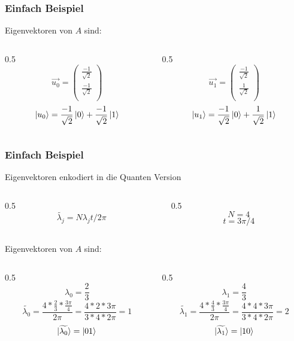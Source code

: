 \begin{frame}
    \frametitle{Einfach Beispiel}


    Eigenvektoren von $A$ sind:    
    \begin{columns}[c]
        \begin{column}{0.5\hsize}\centering
            $$ \vec{u_0} = \begin{pmatrix} \frac{-1}{\sqrt{2}}\\ \frac{-1}{\sqrt{2}}\\ \end{pmatrix}$$
            $$ \ket{u_0} = \frac{-1}{\sqrt{2}}\ket{0} + \frac{-1}{\sqrt{2}}\ket{1}$$
        \end{column}

        \begin{column}{0.5\hsize}
            $$\vec{u_1} = \begin{pmatrix} \frac{-1}{\sqrt{2}}\\ \frac{1}{\sqrt{2}}\\ \end{pmatrix}$$
            $$\ket{u_1}= \frac{-1}{\sqrt{2}}\ket{0} + \frac{1}{\sqrt{2}}\ket{1}$$
        \end{column}
    \end{columns}

\end{frame}

\begin{frame}
    \frametitle{Einfach Beispiel}

    Eigenvektoren enkodiert in die Quanten Version
    \begin{columns}[c]
        \begin{column}{0.5\hsize}\centering
        $$\widetilde{\lambda_j} = N\lambda_jt/2\pi$$
        \end{column}

        \begin{column}{0.5\hsize}
            $$N = 4$$
            $$t = 3\pi/4$$
        \end{column}
    \end{columns}

    \hfil

    \hfil

    Eigenvektoren von $A$ sind:    
    \begin{columns}[c]
        \begin{column}{0.5\hsize}\centering
            $$\lambda_0 = \frac{2}{3}$$
            $$\widetilde{\lambda_0} =\frac{4*\frac{2}{3}*\frac{3\pi}{4}}{2 \pi} =\frac{4*2*3\pi}{3*4* 2 \pi} = 1$$
            $$\ket{\widetilde{\lambda_0}} = \ket{01}$$
        \end{column}

        \begin{column}{0.5\hsize}
            $$\lambda_1 = \frac{4}{3}$$
            $$\widetilde{\lambda_1} =\frac{4*\frac{4}{3}*\frac{3\pi}{4}}{2 \pi} =\frac{4*4*3\pi}{3*4* 2 \pi} = 2$$
            $$\ket{\widetilde{\lambda_1}} = \ket{10}$$
        \end{column}
    \end{columns}
\end{frame}


